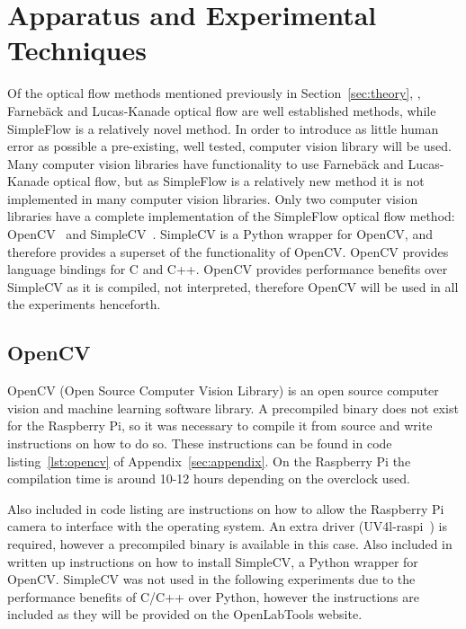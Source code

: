 \chapter{Apparatus and Experimental Techniques}
\label{sec:apparatus}

\ifpdf
    \graphicspath{{Section3/Figs/Raster/}{Section3/Figs/PDF/}{Section3/Figs/}}
\else
    \graphicspath{{Section3/Figs/Vector/}{Section3/Figs/}}
\fi

Of the optical flow methods mentioned previously in Section~\ref{sec:theory}, , Farnebäck and Lucas-Kanade optical flow are well established methods, while SimpleFlow is a relatively novel method. In order to introduce as little human error as possible a pre-existing, well tested, computer vision library will be used. Many computer vision libraries have functionality to use Farnebäck and Lucas-Kanade optical flow, but as SimpleFlow is a relatively new method it is not implemented in many computer vision libraries. Only two computer vision libraries have a complete implementation of the SimpleFlow optical flow method: OpenCV~\cite{opencv} and SimpleCV~\cite{simplecv}. SimpleCV is a Python wrapper for OpenCV, and therefore provides a superset of the functionality of OpenCV. OpenCV provides language bindings for C and C++. OpenCV provides performance benefits over SimpleCV as it is compiled, not interpreted, therefore OpenCV will be used in all the experiments henceforth.

\section{OpenCV}

OpenCV (Open Source Computer Vision Library) is an open source computer vision and machine learning software library. A precompiled binary does not exist for the Raspberry Pi, so it was necessary to compile it from source and write instructions on how to do so. These instructions can be found in code listing~\ref{lst:opencv} of Appendix~\ref{sec:appendix}. On the Raspberry Pi the compilation time is around 10-12 hours depending on the overclock used. 

Also included in code listing are instructions on how to allow the Raspberry Pi camera to interface with the operating system. An extra driver (UV4l-raspi~\cite{uv4l}) is required, however a precompiled binary is available in this case. Also included in written up instructions on how to install SimpleCV, a Python wrapper for OpenCV. SimpleCV was not used in the following experiments due to the performance benefits of C/C++ over Python, however the instructions are included as they will be provided on the OpenLabTools website.

